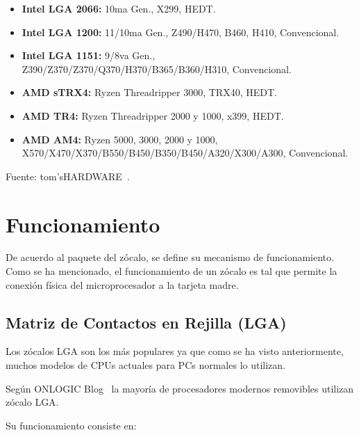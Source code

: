 \documentclass[conference]{IEEEtran}
\begin{document}
    \begin{itemize}
        \item \textbf{Intel LGA 2066:} 10ma Gen., X299, HEDT.
        \item \textbf{Intel LGA 1200:} 11/10ma Gen., Z490/H470, B460, H410,
        Convencional.
        \item \textbf{Intel LGA 1151:} 9/8va Gen.,
        Z390/Z370/Z370/Q370/H370/B365/B360/H310, Convencional.
        \item \textbf{AMD sTRX4:} Ryzen Threadripper 3000, TRX40, HEDT.
        \item \textbf{AMD TR4:} Ryzen Threadripper 2000 y 1000, x399, HEDT.
        \item \textbf{AMD AM4:} Ryzen 5000, 3000, 2000 y 1000,
        X570/X470/X370/B550/B450/B350/B450/A320/X300/A300, Convencional.
    \end{itemize}

    \small Fuente: tom'sHARDWARE~\cite{harding-2021}.

    \section{Funcionamiento}\label{sec:funcionamiento}

    De acuerdo al paquete del zócalo, se define su mecanismo de
    funcionamiento. Como se ha mencionado, el funcionamiento de un zócalo es
    tal que permite la conexión física del microprocesador a la tarjeta madre.

    \subsection{Matriz de Contactos en Rejilla (LGA)}\label{subsec:matriz-de
    -contactos-en-rejilla-(lga)}

    Los zócalos LGA son los más populares ya que como se ha visto
    anteriormente, muchos modelos de CPUs actuales para PCs normales lo
    utilizan.

    \bigbreak

    Según ONLOGIC Blog~\cite{fanton-2021} la mayoría de procesadores modernos
    removibles utilizan zócalo LGA.

    \bigbreak

    Su funcionamiento consiste en:

    \bigbreak
\end{document}
